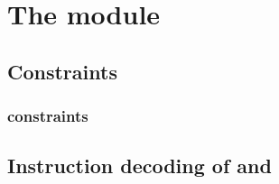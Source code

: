 \def\es                         {\col{INV.}}
\def\ip                         {\col{PUSH4}}
\def\pe                         {\col{PUSH18}}
\def\gz                         {{\color{gray!60}\mathtt{0x\,0}}}	
\def\qmda                       {{\color{gray!60}\overset{\displaystyle\vdots}?}} %
\def\qmdb                       {{\color{gray!60}\underset{\displaystyle\vdots}?}} %

\section{The \romMod{} module}


\subsection{Constraints}





\subsubsection{\nBytes{} constraints}                                                                   




\subsection{Instruction decoding of  and } \label{rom: instruction decoding} 
